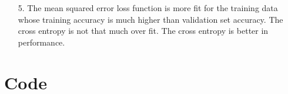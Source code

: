 \documentclass[11pt]{article}
\begin{document}
\begin{itemize}
\item[5.]
The mean squared error loss function is more fit for the training data whose training accuracy is much higher than validation set accuracy. The cross entropy is not that much over fit.
The cross entropy is better in performance.


\end{itemize}


\newpage
\section*{Code}
\end{document}
